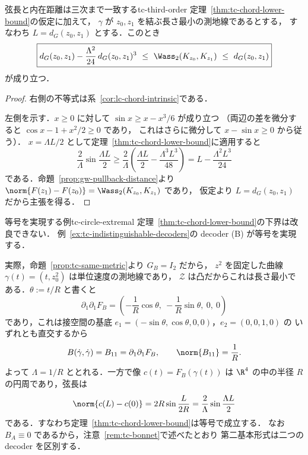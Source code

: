 \begin{corollary}{弦長と内在距離は三次まで一致する}{tc-third-order}
  定理~\ref{thm:tc-chord-lower-bound}の仮定に加えて，
  $\gamma$ が $z_0,z_1$ を結ぶ長さ最小の測地線であるとする，
  すなわち $L=d_G(z_0,z_1)$ とする．このとき
  \[
    \boxed{
      d_G(z_0,z_1)-\frac{\Lambda^2}{24}\,d_G(z_0,z_1)^3
      \ \leq\
      \Wass_2(K_{z_0},K_{z_1})
      \ \leq\
      d_G(z_0,z_1)
    }
  \]
  が成り立つ．
\end{corollary}

\begin{proof}
  右側の不等式は系~\ref{cor:lc-chord-intrinsic}である．

  左側を示す．$x\geq0$ に対して $\sin x\geq x-x^3/6$ が成り立つ
  （両辺の差を微分すると $\cos x-1+x^2/2\geq0$ であり，
  これはさらに微分して $x-\sin x\geq0$ から従う）．
  $x=\Lambda L/2$ として定理~\ref{thm:tc-chord-lower-bound}に適用すると
  \[
    \frac{2}{\Lambda}\sin\frac{\Lambda L}{2}
    \geq\frac{2}{\Lambda}
      \left(\frac{\Lambda L}{2}-\frac{\Lambda^3L^3}{48}\right)
    =L-\frac{\Lambda^2L^3}{24}
  \]
  である．命題~\ref{prop:gw-pullback-distance}より
  $\norm{F(z_1)-F(z_0)}=\Wass_2(K_{z_0},K_{z_1})$ であり，
  仮定より $L=d_G(z_0,z_1)$ だから主張を得る．
\end{proof}

\begin{remark}{等号を実現する例}{tc-circle-extremal}
  定理~\ref{thm:tc-chord-lower-bound}の下界は改良できない．
  例~\ref{ex:tc-indistinguishable-decoders}の decoder (B) が等号を実現する．

  実際，命題~\ref{prop:tc-same-metric}より $G_B=I_2$ だから，
  $z^2$ を固定した曲線 $\gamma(t)=(t,z^2_0)$ は単位速度の測地線であり，
  $\mathcal{Z}$ は凸だからこれは長さ最小である．$\theta:=t/R$ と書くと
  \[
    \partial_1\partial_1F_B
    =\left(-\frac{1}{R}\cos\theta,\ -\frac1R\sin\theta,\ 0,\ 0\right)
  \]
  であり，これは接空間の基底
  $e_1=(-\sin\theta,\cos\theta,0,0)$，$e_2=(0,0,1,0)$ の
  いずれとも直交するから
  \[
    B(\dot\gamma,\dot\gamma)=B_{11}=\partial_1\partial_1F_B,
    \qquad
    \norm{B_{11}}=\frac1R .
  \]
  よって $\Lambda=1/R$ ととれる．一方で像 $c(t)=F_B(\gamma(t))$ は
  $\R^4$ の中の半径 $R$ の円周であり，弦長は
  \[
    \norm{c(L)-c(0)}=2R\sin\frac{L}{2R}
    =\frac{2}{\Lambda}\sin\frac{\Lambda L}{2}
  \]
  である．すなわち定理~\ref{thm:tc-chord-lower-bound}は等号で成立する．
  なお $B_A\equiv0$ であるから，注意~\ref{rem:tc-bonnet}で述べたとおり
  第二基本形式は二つの decoder を区別する．
\end{remark}

